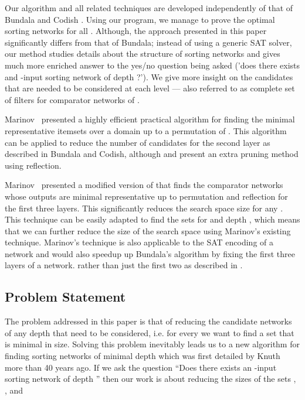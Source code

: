 \documentclass[13pt,a4paper]{article}
\begin{document}
Our algorithm and all related techniques are developed independently of that of Bundala \cite{BundalaCCSZ14_Optimal_Depth} and Codish \cite{CodishCS14:Two_Layer_Prefix} \cite{CodishCS14a_The_End_Game}. Using our program, we manage to prove the optimal sorting networks for all . Although, the approach presented in this paper significantly differs from that of Bundala; instead of using a generic SAT solver, our method studies details about the structure of sorting networks and gives much more enriched answer to the yes/no question being asked ('does there exists and -input sorting network of depth ?'). We give more insight on the candidates that are needed to be considered at each level --- also referred to as complete set of filters  for comparator networks of  \cite{Marinov:SortingNetworks:ThirdLevel}.

Marinov~\cite{Marinov:ExtremalSets:Permutation} presented a highly efficient practical algorithm for finding the minimal representative itemsets over a domain  up to a permutation of . This algorithm can be applied to reduce the number of candidates for the second layer as described in Bundala and Codish, although \cite{BundalaCCSZ14_Optimal_Depth} and \cite{CodishCS14:Two_Layer_Prefix} present an extra pruning method using reflection.

Marinov~\cite{Marinov:SortingNetworks:ThirdLevel} presented a modified version of \cite{Marinov:ExtremalSets:Permutation} that finds the comparator networks whose outputs are minimal representative up to permutation and reflection  for the first three layers. This significantly reduces the search space size for any . This technique can be easily adapted to find the sets  for and depth , which means that we can further reduce the size of the search space using Marinov's existing technique. Marinov's technique is also applicable to the SAT encoding of a network and would also speedup up Bundala's algorithm by fixing the first three layers of a network. rather than just the first two as described in \cite{BundalaCCSZ14_Optimal_Depth}.


\subsection{ Problem Statement }

The problem addressed in this paper is that of reducing the candidate networks of any depth that need to be considered, i.e. for every  we want to find a set  that is minimal in size. Solving this problem inevitably leads us to a new algorithm for finding sorting networks of minimal depth which was first detailed by Knuth \cite{Knuth73} more than 40 years ago. If we ask the question ``Does there exists an -input sorting network of depth '' then our work is about reducing the sizes of the sets , ,  and 
\end{document}
